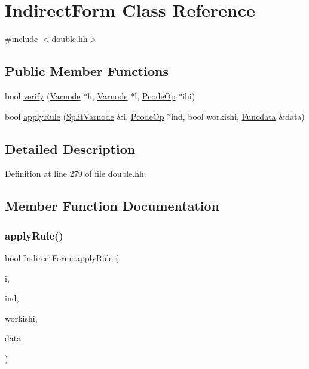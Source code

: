 \hypertarget{class_indirect_form}{}\section{Indirect\+Form Class Reference}
\label{class_indirect_form}


{\ttfamily \#include $<$double.\+hh$>$}

\subsection*{Public Member Functions}
\begin{DoxyCompactItemize}
\item 
bool \mbox{\hyperlink{class_indirect_form_a4a8c810890cca97f193fc9a3a720f0fc}{verify}} (\mbox{\hyperlink{class_varnode}{Varnode}} $\ast$h, \mbox{\hyperlink{class_varnode}{Varnode}} $\ast$l, \mbox{\hyperlink{class_pcode_op}{Pcode\+Op}} $\ast$ihi)
\item 
bool \mbox{\hyperlink{class_indirect_form_ae3b52756c12fe52a8276bd93019da17a}{apply\+Rule}} (\mbox{\hyperlink{class_split_varnode}{Split\+Varnode}} \&i, \mbox{\hyperlink{class_pcode_op}{Pcode\+Op}} $\ast$ind, bool workishi, \mbox{\hyperlink{class_funcdata}{Funcdata}} \&data)
\end{DoxyCompactItemize}


\subsection{Detailed Description}


Definition at line 279 of file double.\+hh.



\subsection{Member Function Documentation}
\mbox{\label{class_indirect_form_ae3b52756c12fe52a8276bd93019da17a}} 
\subsubsection{\texorpdfstring{applyRule()}{applyRule()}}
{\footnotesize\ttfamily bool Indirect\+Form\+::apply\+Rule (\begin{DoxyParamCaption}\item[{\mbox{\hyperlink{class_split_varnode}{Split\+Varnode}} \&}]{i,  }\item[{\mbox{\hyperlink{class_pcode_op}{Pcode\+Op}} $\ast$}]{ind,  }\item[{bool}]{workishi,  }\item[{\mbox{\hyperlink{class_funcdata}{Funcdata}} \&}]{data }\end{DoxyParamCaption})}



